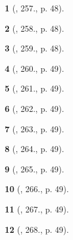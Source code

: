 \documentclass{article}
\newtheorem{baitoan}{}
\begin{document}
\begin{baitoan}[\cite{Binh_Toan_8_tap_1}, 257., p. 48]
	
\end{baitoan}

\begin{baitoan}[\cite{Binh_Toan_8_tap_1}, 258., p. 48]
	
\end{baitoan}

\begin{baitoan}[\cite{Binh_Toan_8_tap_1}, 259., p. 48]
	
\end{baitoan}

\begin{baitoan}[\cite{Binh_Toan_8_tap_1}, 260., p. 49]
	
\end{baitoan}

\begin{baitoan}[\cite{Binh_Toan_8_tap_1}, 261., p. 49]
	
\end{baitoan}

\begin{baitoan}[\cite{Binh_Toan_8_tap_1}, 262., p. 49]
	
\end{baitoan}

\begin{baitoan}[\cite{Binh_Toan_8_tap_1}, 263., p. 49]
	
\end{baitoan}

\begin{baitoan}[\cite{Binh_Toan_8_tap_1}, 264., p. 49]
	
\end{baitoan}

\begin{baitoan}[\cite{Binh_Toan_8_tap_1}, 265., p. 49]
	
\end{baitoan}

\begin{baitoan}[\cite{Binh_Toan_8_tap_1}, 266., p. 49]
	
\end{baitoan}

\begin{baitoan}[\cite{Binh_Toan_8_tap_1}, 267., p. 49]
	
\end{baitoan}

\begin{baitoan}[\cite{Binh_Toan_8_tap_1}, 268., p. 49]
	
\end{baitoan}
\end{document}
